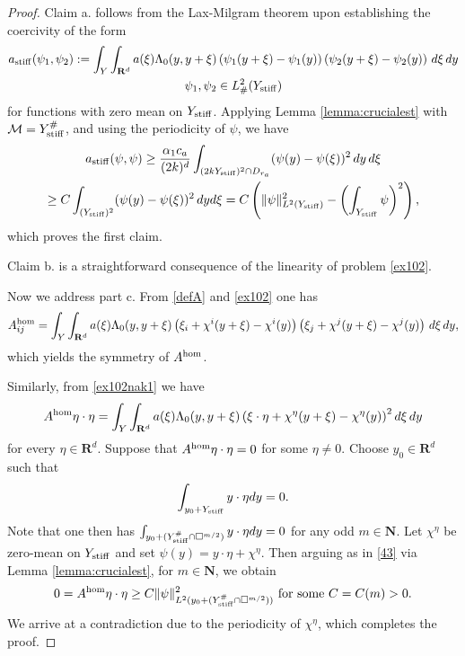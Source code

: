 \documentclass[11pt]{article}
\newcommand\stiff{{\rm stiff}}
\newcommand{\R}{\mathbf{R}}
\def\M{\mathcal{M}}
\def\hom{{\rm hom}}
\newcommand\N{\mathbf{N}}
\theoremstyle{remark}
\begin{document}
\begin{proof}
	Claim a. follows from the Lax-Milgram theorem upon establishing  the coercivity of the form
	\begin{multline*}
		a_{\rm stiff}(\psi_1,\psi_2):= 	\int_{Y} \int_{\R^d} a(\xi) \Lambda_0 (y,y+\xi)\left(\psi_1(y+\xi)-\psi_1(y) \right)\left(\psi_2(y+\xi)-\psi_2(y) \right) \,d\xi\, dy
		\\
		\psi_1, \psi_2 \in L^2_\#(Y_\stiff)
	\end{multline*}
	for functions with zero mean  on $Y_\stiff$. Applying  Lemma \ref{lemma:crucialest} with $\M= Y_\stiff^\#$, and using the periodicity of $\psi$, we have
	\begin{multline}\label{43}
	a_{\rm stiff} (\psi,\psi) \geq	\frac{\alpha_1 c_a}{(2k)^d} \int_{(2kY_\stiff)^2 \cap D_{r_a}  } (\psi(y)-\psi(\xi))^2 \, dy\, d \xi\\ \geq
	C   \int_{(Y_\stiff)^2} (\psi(y)-\psi(\xi))^2 \,dy d\xi=C \left(\|\psi\|^2_{L^2(Y_\stiff)}-\left(\int_{Y_\stiff}\psi \right)^2\right),
\end{multline}
	which proves the first claim.
	
	Claim b. is a straightforward consequence of the linearity of problem \eqref{ex102}.
	
	Now we address part c. From \eqref{defA} and \eqref{ex102} one has
	\begin{equation*}%
		A^{\rm hom}_{ij}=\int_{Y} \int_{\R^d} a(\xi) \Lambda_0 (y,y+\xi)\left(\xi_i+\chi^i(y+\xi)-\chi^i(y) \right)\left(\xi_j+{\chi}^j(y+\xi)-{\chi}^j(y)\right)\,d\xi\,dy,
	\end{equation*}
	which yields the symmetry of $A^{\rm hom}$.
	
	Similarly, from \eqref{ex102nak1} we have
	\begin{equation*}%
		  A^{\hom} \eta \cdot \eta =\int_{Y} \int_{\R^d} a(\xi) \Lambda_0 (y,y+\xi)\left( \xi\cdot\eta+\chi^\eta(y+\xi)-\chi^\eta(y) \right)^2 d\xi\,dy
	\end{equation*} 	
	for every $\eta \in \R^d$. Suppose that $  A^{\hom} \eta \cdot \eta   =0$ for some $\eta \neq 0$. Choose $y_0\in \R^d$ such that
	\begin{equation*}
		\int_{y_0+Y_\stiff}   y \cdot\eta  dy = 0.
	\end{equation*}
	Note that one then has $	\int_{y_0+(Y_\stiff^\# \cap \square^{m/2})}   y \cdot\eta  dy = 0$ for any odd $m\in \N$.
	Let $\chi^\eta$  be  zero-mean on $Y_\stiff$ and set $\psi(y) =   y \cdot\eta   + \chi^\eta$. Then arguing as in \eqref{43} via Lemma \ref{lemma:crucialest}, for  $m\in \N$, we obtain
	\begin{equation*} %
		0=  A^{\hom} \eta \cdot \eta   \geq C \|\psi\|^2_{L^2(y_0+(Y_\stiff^\# \cap \square^{m/2}))} \mbox{ for some } C=C(m)>0.
	\end{equation*} 	
	We arrive at a contradiction due to the periodicity of $\chi^\eta$, which completes the proof.
\end{proof} 	
\end{document}
